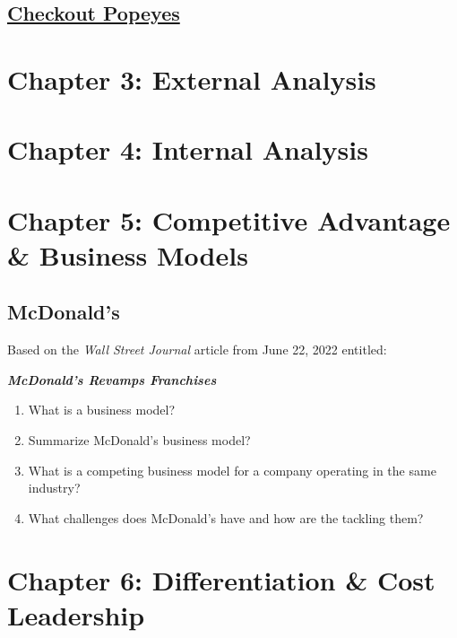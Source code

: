 \documentclass[
]{book}
\providecommand{\tightlist}{%
  \setlength{\itemsep}{0pt}\setlength{\parskip}{0pt}}
\begin{document}
\hypertarget{checkout-popeyes}{%
\section{\texorpdfstring{\href{https://www.bizjournals.com/bizwomen/news/profiles-strategies/2015/05/inside-thepopeyes-turnaround-how-cheryl-bachelder.html?page=all}{Checkout Popeyes}}{Checkout Popeyes}}\label{checkout-popeyes}}

\hypertarget{chapter-3-external-analysis}{%
\chapter{Chapter 3: External Analysis}\label{chapter-3-external-analysis}}

\hypertarget{chapter-4-internal-analysis}{%
\chapter{Chapter 4: Internal Analysis}\label{chapter-4-internal-analysis}}

\hypertarget{chapter-5-competitive-advantage-business-models}{%
\chapter{Chapter 5: Competitive Advantage \& Business Models}\label{chapter-5-competitive-advantage-business-models}}

\hypertarget{mcdonalds}{%
\section{McDonald's}\label{mcdonalds}}

Based on the \emph{Wall Street Journal} article from June 22, 2022 entitled:

\textbf{\emph{McDonald's Revamps Franchises}}

\begin{enumerate}
\def\labelenumi{\arabic{enumi}.}
\tightlist
\item
  What is a business model?
\item
  Summarize McDonald's business model?
\item
  What is a competing business model for a company operating in the same industry?
\item
  What challenges does McDonald's have and how are the tackling them?
\end{enumerate}

\hypertarget{chapter-6-differentiation-cost-leadership}{%
\chapter{Chapter 6: Differentiation \& Cost Leadership}\label{chapter-6-differentiation-cost-leadership}}
\end{document}
